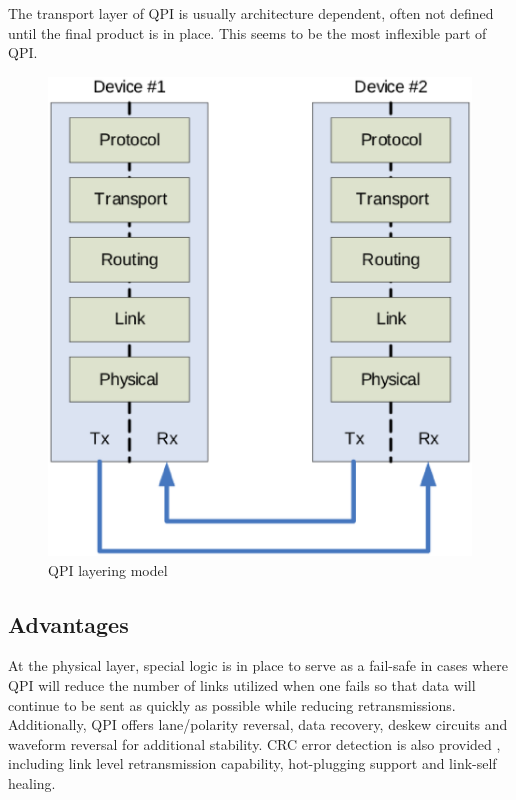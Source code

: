 \documentclass[conference]{IEEEtran}
\begin{document}
The transport layer of QPI is usually architecture dependent, often not defined
until the final product is in place. This seems to be the most inflexible part
of QPI\cite{intelQPIintro}.

\begin{figure}[!t]
	\begin{center}
		\includegraphics[scale=.25]{qpiLayers}
	\end{center}
	\caption{QPI layering model}
	\label{fig:qpi:layers}
\end{figure}
\subsection{Advantages}
At the physical layer, special logic is in place to serve as a fail-safe in
cases where QPI will reduce the number of links utilized when one fails so that
data will continue to be sent as quickly as possible while reducing
retransmissions. Additionally, QPI offers lane/polarity reversal, data recovery,
deskew circuits and waveform reversal for additional
stability\cite{intelQPIintro}. CRC error detection is also provided , including
link level retransmission capability, hot-plugging support and link-self
healing. 
\end{document}
